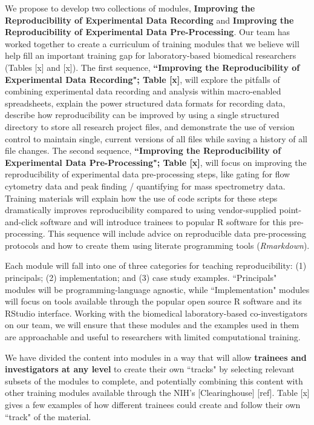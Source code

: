 \documentclass[pdftex,english,11pt,parskip=half]{scrartcl}
\begin{document}
We propose to develop two collections of modules, \textbf{Improving the Reproducibility of Experimental Data Recording} and \textbf{Improving the Reproducibility of Experimental Data Pre-Processing}. Our team has worked together to create a curriculum of training modules that we believe will help fill an important training gap for laboratory-based biomedical researchers (Tables [x] and [x]). The first sequence, \textbf{``Improving the Reproducibility of Experimental Data Recording"; Table [x]}, will explore the pitfalls of combining experimental data recording and analysis within macro-enabled spreadsheets, explain the power structured data formats for recording data, describe how reproducibility can be improved by using a single structured directory to store all research project files, and demonstrate the use of version control to maintain single, current versions of all files while saving a history of all file changes. The second sequence, \textbf{``Improving the Reproducibility of Experimental Data Pre-Processing"; Table [x]}, will focus on improving the reproducibility of experimental data pre-processing steps, like gating for flow cytometry data and peak finding / quantifying for mass spectrometry data. Training materials will explain how the use of code scripts for these steps dramatically improves reproducibility compared to using vendor-supplied point-and-click software and will introduce trainees to popular R software for this pre-processing. This sequence will include advice on reproducible data pre-processing protocols and how to create them using literate programming tools (\textit{Rmarkdown}).

Each module will fall into one of three categories for teaching reproducibility: (1) principals; (2) implementation; and (3) case study examples. ``Principals" modules will be programming-language agnostic, while ``Implementation" modules will focus on tools available through the popular open source R software and its RStudio interface. Working with the biomedical laboratory-based co-investigators on our team, we will ensure that these modules and the examples used in them are approachable and useful to researchers with limited computational training. 

We have divided the content into modules in a way that will allow \textbf{trainees and investigators at any level} to create their own ``tracks" by selecting relevant subsets of the modules to complete, and potentially combining this content with other training modules available through the NIH's [Clearinghouse] [ref]. Table [x] gives a few examples of how different trainees could create and follow their own ``track" of the material. 
\end{document}
